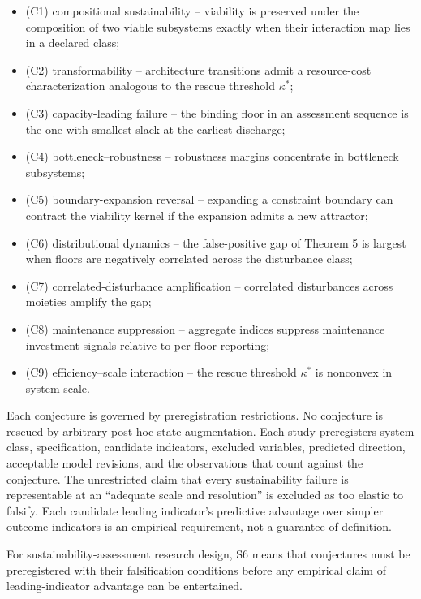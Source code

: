 \begin{itemize}[leftmargin=2em]
\item (C1) compositional sustainability -- viability is preserved under the composition of two viable subsystems exactly when their interaction map lies in a declared class;
\item (C2) transformability -- architecture transitions admit a resource-cost characterization analogous to the rescue threshold $\kappa^*$;
\item (C3) capacity-leading failure -- the binding floor in an assessment sequence is the one with smallest slack at the earliest discharge;
\item (C4) bottleneck--robustness -- robustness margins concentrate in bottleneck subsystems;
\item (C5) boundary-expansion reversal -- expanding a constraint boundary can contract the viability kernel if the expansion admits a new attractor;
\item (C6) distributional dynamics -- the false-positive gap of Theorem 5 is largest when floors are negatively correlated across the disturbance class;
\item (C7) correlated-disturbance amplification -- correlated disturbances across moieties amplify the gap;
\item (C8) maintenance suppression -- aggregate indices suppress maintenance investment signals relative to per-floor reporting;
\item (C9) efficiency--scale interaction -- the rescue threshold $\kappa^*$ is nonconvex in system scale.
\end{itemize}

Each conjecture is governed by preregistration restrictions. No conjecture is rescued by arbitrary post-hoc state augmentation. Each study preregisters system class, specification, candidate indicators, excluded variables, predicted direction, acceptable model revisions, and the observations that count against the conjecture. The unrestricted claim that every sustainability failure is representable at an ``adequate scale and resolution'' is excluded as too elastic to falsify. Each candidate leading indicator's predictive advantage over simpler outcome indicators is an empirical requirement, not a guarantee of definition.

For sustainability-assessment research design, S6 means that conjectures must be preregistered with their falsification conditions before any empirical claim of leading-indicator advantage can be entertained.


